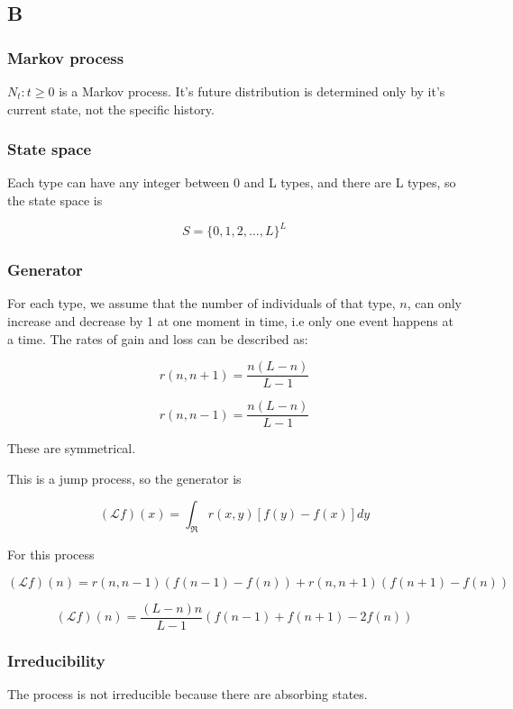 \documentclass{article}
\begin{document}
\subsection{B}

\subsubsection{Markov process}

$N_t : t \geq 0$ is a Markov process. It's future distribution is determined only by it's current state, not the specific history.

\subsubsection{State space}

Each type can have any integer between 0 and L types, and there are L types, so the state space is 

$$S = \{0,1,2,...,L\}^L$$

\subsubsection{Generator}

For each type, we assume that the number of individuals of that type, $n$, can only increase and decrease by 1 at one moment in time, i.e only one event happens at a time. The rates of gain and loss can be described as:

$$r(n,n+1) = \frac{n(L-n)}{L-1}$$

$$r(n,n-1) = \frac{n(L-n)}{L-1}$$

These are symmetrical. 


This is a jump process, so the generator is

$$(\mathcal{L}f)(x) = \int_{\Re} r(x,y)[f(y)-f(x)]dy$$

For this process

$$(\mathcal{L}f)(n) = r(n,n-1)(f(n-1)-f(n)) + r(n,n+1)(f(n+1)-f(n))$$

$$(\mathcal{L}f)(n) = \frac{(L-n)n}{L-1}(f(n-1) + f(n+1) - 2f(n))$$




\subsubsection{Irreducibility}

The process is not irreducible because there are absorbing states. 
\end{document}

